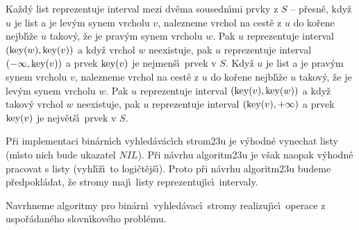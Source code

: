\flushpar Ka\v zd\'y list reprezentuje interval mezi dv\v ema 
sousedn\'\i mi prvky z $S$ -- p\v resn\v e, kdy\v z $u$ je list a je 
lev\'ym synem vrcholu $v$, nalezneme vrchol na cest\v e z $u$ 
do ko\v rene nejbl\'\i\v ze $u$ takov\'y, \v ze je prav\'ym synem 
vrcholu $w$. Pak $u$ repre\-zentuje interval $(\operatorname{key}(w),\operatorname{key}(v))$ a 
kdy\v z vrchol $w$ neexistuje, pak $u$ repre\-zentuje 
interval $(-\infty ,\operatorname{key}(v))$ a prvek $\operatorname{key}(v)$ je nej\-men\v s\'\i\ prvek v 
$S$.  Kdy\v z $u$ je list a je prav\'ym synem vrcholu $v$, 
nalezneme vrchol na cest\v e z $u$ do ko\v rene nejbl\'\i\v ze 
$u$ takov\'y, \v ze je lev\'ym synem vrcholu $w$. Pak $u$ repre\-zentuje 
interval $(\operatorname{key}(v),\operatorname{key}(w))$ a kdy\v z takov\'y vrchol $w$ neexistuje, 
pak $u$ repre\-zentuje interval $(\operatorname{key}(v),+\infty )$ a prvek $\operatorname{key}
(v)$ 
je nejv\v et\v s\'\i\ prvek v $S$.  
\medskip

\flushpar P\v ri implementaci bin\'arn\'\i ch vyhled\'av\'ac\'\i ch 
strom\accent23u je v\'yhodn\'e vynechat listy (m\'\i sto nich bude 
ukazatel $NIL$). P\v ri n\'avrhu algoritm\accent23u je v\v sak 
naopak v\'yhodn\'e 
pracovat s listy (vyhl\'\i\v z\'\i\ to logi\v ct\v ej\v s\'\i ). Proto p\v ri n\'avrhu 
algoritm\accent23u budeme p\v redpokl\'adat, \v ze stromy maj\'\i\ 
listy reprezentuj\'\i c\'\i\ intervaly.
\medskip

\flushpar Navrhneme algoritmy pro bin\'arn\'\i\ vyhled\'avac\'\i\ stromy 
rea\-lizuj\'\i\-c\'\i\ operace z uspo\v r\'adan\'eho slovn\'\i kov\'eho probl\'emu.
\medskip


